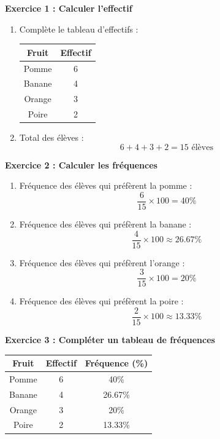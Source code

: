 \documentclass{article}
\begin{document}
\begin{tcolorbox}[colback=green!10!white, colframe=green!75!black, title=\textcolor{white}{Exercices}]

  \textbf{Exercice 1 : Calculer l'effectif}
\begin{enumerate}
    \item Complète le tableau d'effectifs :
    
    \begin{center}
    \begin{tabular}{|c|c|}
    \hline
    Fruit & Effectif \\
    \hline
    Pomme & 6 \\
    Banane & 4 \\
    Orange & 3 \\
    Poire & 2 \\
    \hline
    \end{tabular}
    \end{center}

    \item Total des élèves : 
    \[
    6 + 4 + 3 + 2 = 15 \text{ élèves}
    \]
\end{enumerate}

\vspace{0.5cm}

\textbf{Exercice 2 : Calculer les fréquences}
\begin{enumerate}
    \item Fréquence des élèves qui préfèrent la pomme :
    \[
    \frac{6}{15} \times 100 = 40\%
    \]
    
    \item Fréquence des élèves qui préfèrent la banane :
    \[
    \frac{4}{15} \times 100 \approx 26.67\%
    \]

    \item Fréquence des élèves qui préfèrent l'orange :
    \[
    \frac{3}{15} \times 100 = 20\%
    \]

    \item Fréquence des élèves qui préfèrent la poire :
    \[
    \frac{2}{15} \times 100 \approx 13.33\%
    \]
\end{enumerate}

\vspace{0.5cm}

\textbf{Exercice 3 : Compléter un tableau de fréquences}
\begin{center}
\begin{tabular}{|c|c|c|}
\hline
Fruit & Effectif & Fréquence (\%) \\
\hline
Pomme & 6 & 40\% \\
Banane & 4 & 26.67\% \\
Orange & 3 & 20\% \\
Poire & 2 & 13.33\% \\
\hline
\end{tabular}
\end{center}


\end{tcolorbox}
\end{document}
